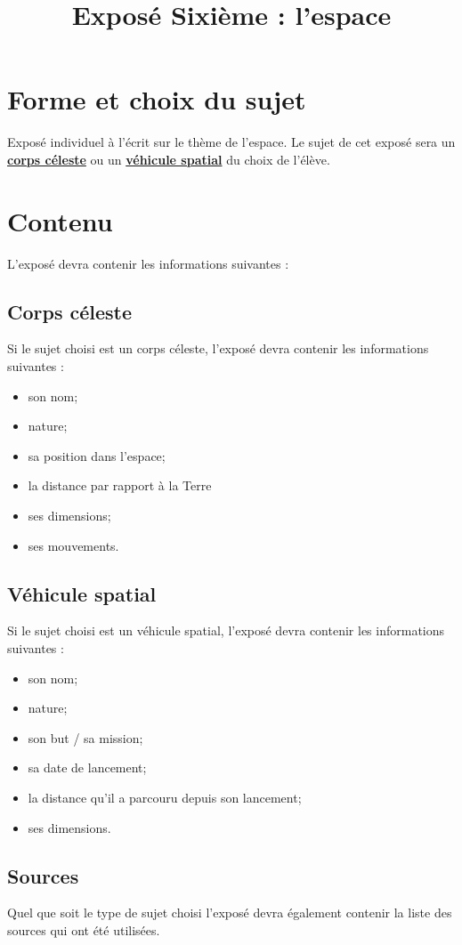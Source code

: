 \documentclass[french]{article}
\title{Exposé Sixième : l'espace}
\newcommand{\kw}[1]{\textbf{\underline{#1}}}
\begin{document}
\maketitle

\section{Forme et choix du sujet}

Exposé individuel à l'écrit sur le thème de l'espace. Le sujet de cet exposé sera un \kw{corps céleste} ou un \kw{véhicule spatial} du choix de l'élève.

\section{Contenu}

L'exposé devra contenir les informations suivantes :

\subsection{Corps céleste}
	Si le sujet choisi est un corps céleste, l'exposé devra contenir les informations suivantes :
	\begin{itemize}
		\item son nom;
		\item nature;
		\item sa position dans l'espace;
		\item la distance par rapport à la Terre
		\item ses dimensions;
		\item ses mouvements.
		
	
	\end{itemize}

\subsection{Véhicule spatial}
Si le sujet choisi est un véhicule spatial, l'exposé devra contenir les informations suivantes :
	\begin{itemize}
		\item son nom;
		\item nature;
		\item son but / sa mission;
		\item sa date de lancement;
		\item la distance qu'il a parcouru depuis son lancement;
		\item ses dimensions.
		
		
	\end{itemize}

\subsection{Sources}

Quel que soit le type de sujet choisi l'exposé devra également contenir la liste des sources qui ont été utilisées.
\end{document}
